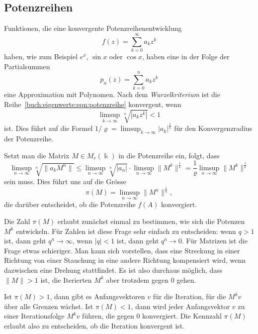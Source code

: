 %
%
\subsection{Potenzreihen
\label{buch:subsection:potenzreihen}}
Funktionen, die eine konvergente Potenzreihenentwicklung
\begin{equation}
f(z)
=
\sum_{k=0}^\infty a_kz^k
\label{buch:eigenwerte:eqn:potenzreihe}
\end{equation}
haben, wie
zum Beispiel $e^x$, $\sin x$ oder $\cos x$, haben eine in der Folge
der Partialsummen
\[
p_n(z) = \sum_{k=0}^n a_kz^k
\]
eine Approximation mit Polynomen.
Nach dem {\em Wurzelkriterium} ist die
Reihe~\eqref{buch:eigenwerte:eqn:potenzreihe}
konvergent, wenn 
\[
\limsup_{k\to\infty} \sqrt[n]{|a_kz^k|} < 1
\]
ist.
%
Dies führt auf die Formel $1/\varrho = \limsup_{k\to\infty}|a_k|^{\frac1k}$ 
für den Konvergenzradius der Potenzreihe.

Setzt man die Matrix $M\in M_r(\Bbbk)$ in die Potenzreihe ein,
folgt, dass
\[
\limsup_{n\to\infty} \sqrt[n]{\|a_kM^n\|}
\le
\limsup_{n\to\infty} \sqrt[n]{|a_n|}
\cdot
\limsup_{n\to\infty} \|M^k\|^{\frac1k}
=
\frac{1}{\varrho}
\limsup_{n\to\infty} \|M^k\|^{\frac1k}
\]
sein muss.
Dies führt uns auf die Grösse
\begin{equation}
\pi(M)
=
\limsup_{n\to\infty} \|M^n\|^\frac1n,
\label{buch:eqn:gelfand-grenzwert}
\end{equation}
die
darüber entscheidet, ob die Potenzreihe $f(A)$ konvergiert.

Die Zahl $\pi(M)$ erlaubt zunächst einmal zu bestimmen, wie
sich die Potenzen $M^k$ entwickeln.
Für Zahlen ist diese Frage sehr einfach zu entscheiden: wenn $q>1$ ist,
dann geht $q^n\to\infty$, wenn $|q|<1$ ist, dann geht $q^n\to 0$.
Für Matrizen ist die Frage etwas schieriger.
Man kann sich vorstellen, dass eine Streckung in einer Richtung
von einer Stauchung in eine andere Richtung kompensiert wird, wenn
dazwischen eine Drehung stattfindet.
Es ist also durchaus möglich, dass $\|M\|>1$ ist, die
Iterierten $M^k$ aber trotzdem gegen $0$ gehen.

Ist $\pi(M) > 1$, dann gibt es Anfangsvektoren $v$ für die Iteration,
für die $M^kv$ über alle Grenzen wächst.
Ist $\pi(M) < 1$, dann wird jeder Anfangsvektor $v$ zu einer Iterationsfolge
$M^kv$ führen, die gegen $0$ konvergiert.
Die Kennzahl $\pi(M)$ erlaubt also zu entscheiden, ob die
Iteration konvergent ist.
%

